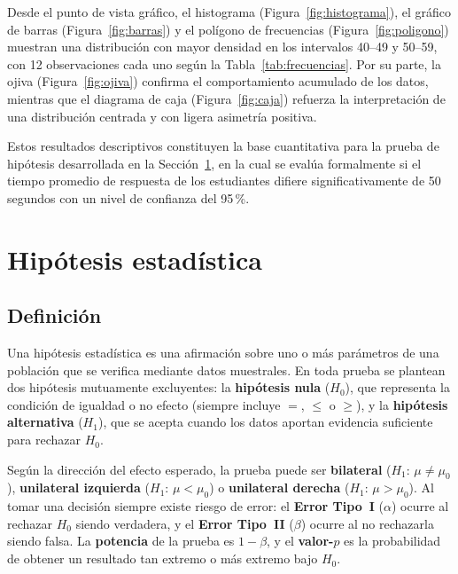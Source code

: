 \documentclass[12pt,letterpaper]{article}
\begin{document}
Desde el punto de vista gráfico, el histograma (Figura~\ref{fig:histograma}), el gráfico de barras (Figura~\ref{fig:barras}) y el polígono de frecuencias (Figura~\ref{fig:poligono}) muestran una distribución con mayor densidad en los intervalos 40--49 y 50--59, con 12 observaciones cada uno según la Tabla~\ref{tab:frecuencias}. Por su parte, la ojiva (Figura~\ref{fig:ojiva}) confirma el comportamiento acumulado de los datos, mientras que el diagrama de caja (Figura~\ref{fig:caja}) refuerza la interpretación de una distribución centrada y con ligera asimetría positiva.

Estos resultados descriptivos constituyen la base cuantitativa para la prueba de
hipótesis desarrollada en la Sección~\ref{sec:hipotesis}, en la cual se evalúa
formalmente si el tiempo promedio de respuesta de los estudiantes difiere
significativamente de 50 segundos con un nivel de confianza del 95\,\%.

\section{Hipótesis estadística}
\label{sec:hipotesis}

\subsection{Definición}

Una hipótesis estadística es una afirmación sobre uno o más parámetros de una población
que se verifica mediante datos muestrales. En toda prueba se plantean dos hipótesis
mutuamente excluyentes: la \textbf{hipótesis nula} ($H_0$), que representa la condición
de igualdad o no efecto (siempre incluye $=$, $\leq$ o $\geq$), y la \textbf{hipótesis
alternativa} ($H_1$), que se acepta cuando los datos aportan evidencia suficiente para
rechazar $H_0$.

Según la dirección del efecto esperado, la prueba puede ser \textbf{bilateral}
($H_1$: $\mu \neq \mu_0$), \textbf{unilateral izquierda} ($H_1$: $\mu < \mu_0$) o
\textbf{unilateral derecha} ($H_1$: $\mu > \mu_0$). Al tomar una decisión siempre
existe riesgo de error: el \textbf{Error Tipo~I} ($\alpha$) ocurre al rechazar $H_0$
siendo verdadera, y el \textbf{Error Tipo~II} ($\beta$) ocurre al no rechazarla siendo
falsa. La \textbf{potencia} de la prueba es $1 - \beta$, y el \textbf{valor-$p$} es
la probabilidad de obtener un resultado tan extremo o más extremo bajo $H_0$.
\end{document}
